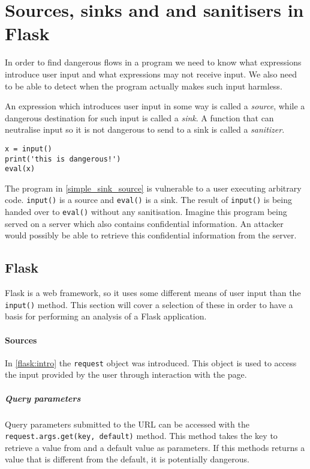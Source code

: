 \section{Sources, sinks and  and sanitisers in Flask}
In order to find dangerous flows in a program we need to know what expressions introduce user input and what expressions may not receive input.
We also need to be able to detect when the program actually makes such input harmless.

An expression which introduces user input in some way is called a \emph{source}, while a dangerous destination for such input is called a \emph{sink}.
A function that can neutralise input so it is not dangerous to send to a sink is called a \emph{sanitizer}.

\begin{lstlisting}[style=python, caption={A simple vulnerable program}, label=simple_sink_source]
x = input()
print('this is dangerous!')
eval(x)
\end{lstlisting}

The program in \cref{simple_sink_source} is vulnerable to a user executing arbitrary code.
\texttt{input()} is a source and \texttt{eval()} is a sink.
The result of \texttt{input()} is being handed over to \texttt{eval()} without any sanitisation.
Imagine this program being served on a server which also contains confidential information.
An attacker would possibly be able to retrieve this confidential information from the server.

\subsection{Flask}
Flask is a web framework, so it uses some different means of user input than the \texttt{input()} method.
This section will cover a selection of these in order to have a basis for performing an analysis of a Flask application.

\paragraph{Sources}
In \cref{flask:intro} the \texttt{request} object was introduced.
This object is used to access the input provided by the user through interaction with the page.

\subparagraph{Query parameters}
Query parameters submitted to the URL can be accessed with the \texttt{request.args.get(key, default)} method.
This method takes the key to retrieve a value from and a default value as parameters.
If this methods returns a value that is different from the default, it is potentially dangerous.

